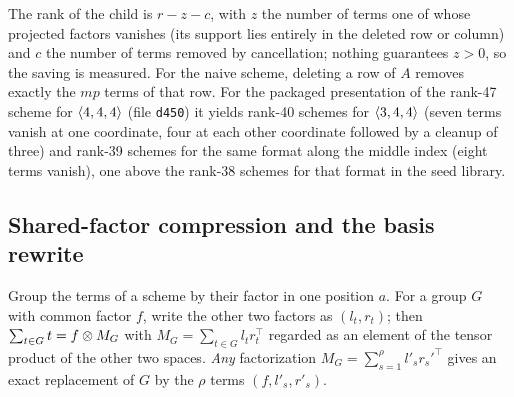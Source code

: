 The rank of the child is $r-z-c$, with $z$ the number of terms one of whose projected factors vanishes (its support lies entirely in the deleted row or column) and $c$ the number of terms removed by
cancellation; nothing guarantees $z>0$, so the saving is measured. For the naive scheme, deleting a row of $A$ removes exactly the $mp$ terms of that row. For the packaged presentation of the rank-47 scheme for $\langle 4,4,4\rangle$ (file \texttt{d450}) it yields rank-40 schemes for $\langle 3,4,4\rangle$
(seven terms vanish at one coordinate, four at each other coordinate followed by a cleanup of three) and rank-39 schemes for the same format along the middle index (eight terms vanish),
one above the rank-38 schemes for that format in the seed library.

\subsection{Shared-factor compression and the basis rewrite}
Group the terms of a scheme by their factor in one position $a$. For a group $G$ with common factor $f$, write the other two factors as $(l_t,r_t)$; then $\sum_{t\in G}t=f\otimes M_G$ with $M_G=\sum_{t\in G}l_t r_t^{\top}$
regarded as an element of the tensor product of the other two spaces. \emph{Any} factorization $M_G=\sum_{s=1}^{\rho}l'_sr_s'^{\top}$ gives an exact replacement of $G$ by the $\rho$ terms $(f,l'_s,r'_s)$.

